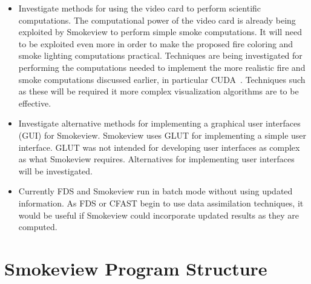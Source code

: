\documentclass[11pt,twoside]{book}
\begin{document}
\begin{itemize}

\item Investigate methods for using the video card to perform
scientific computations. The computational power of the video card
is already  being exploited by Smokeview to perform simple smoke
computations. It will need to be exploited even more in order to
make the proposed fire coloring and smoke lighting computations
practical. Techniques are being investigated for performing the
computations needed to implement the more realistic fire and smoke
computations discussed earlier, in particular CUDA~\cite{CUDA}.
Techniques such as these will be required it more complex
visualization algorithms are to be effective.

\item Investigate alternative methods for implementing a graphical
user interfaces (GUI) for Smokeview. Smokeview uses GLUT for
implementing a simple user interface.  GLUT was not intended for
developing user interfaces as complex as what Smokeview requires.
Alternatives for implementing user interfaces will be
investigated.

\item Currently FDS and Smokeview run in batch mode without using
updated information. As FDS or CFAST begin to use data
assimilation techniques, it would be useful if Smokeview could
incorporate updated results as they are computed.

\end{itemize}

%
%




%
%

\appendix
{}


%
%

\chapter{Smokeview Program Structure}
\label{smvprogstruct}
\end{document}
